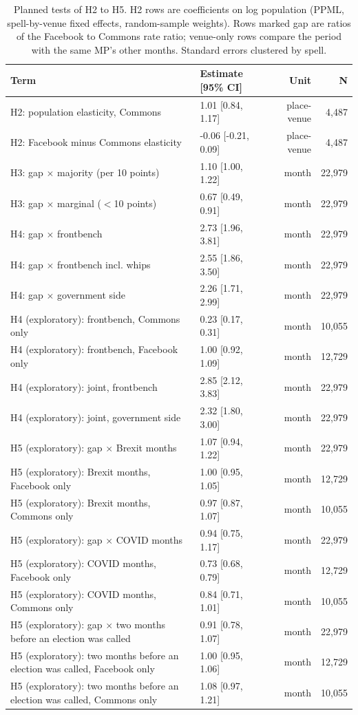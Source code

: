 \documentclass[11pt,a4paper]{article}
\begin{document}
\begin{table}[tbp]\centering\footnotesize\caption{Planned tests of H2 to H5. H2 rows are coefficients on log population (PPML, spell-by-venue fixed effects, random-sample weights). Rows marked gap are ratios of the Facebook to Commons rate ratio; venue-only rows compare the period with the same MP's other months. Standard errors clustered by spell.}\label{tab:het}\begin{tabular}{p{7.2cm}lrr}\toprule Term & Estimate [95\% CI] & Unit & N\\\midrule
H2: population elasticity, Commons & 1.01 [0.84, 1.17] & place-venue & 4,487\\
H2: Facebook minus Commons elasticity & -0.06 [-0.21, 0.09] & place-venue & 4,487\\
H3: gap $\times$ majority (per 10 points) & 1.10 [1.00, 1.22] & month & 22,979\\
H3: gap $\times$ marginal ($<$10 points) & 0.67 [0.49, 0.91] & month & 22,979\\
H4: gap $\times$ frontbench & 2.73 [1.96, 3.81] & month & 22,979\\
H4: gap $\times$ frontbench incl. whips & 2.55 [1.86, 3.50] & month & 22,979\\
H4: gap $\times$ government side & 2.26 [1.71, 2.99] & month & 22,979\\
H4 (exploratory): frontbench, Commons only & 0.23 [0.17, 0.31] & month & 10,055\\
H4 (exploratory): frontbench, Facebook only & 1.00 [0.92, 1.09] & month & 12,729\\
H4 (exploratory): joint, frontbench & 2.85 [2.12, 3.83] & month & 22,979\\
H4 (exploratory): joint, government side & 2.32 [1.80, 3.00] & month & 22,979\\
H5 (exploratory): gap $\times$ Brexit months & 1.07 [0.94, 1.22] & month & 22,979\\
H5 (exploratory): Brexit months, Facebook only & 1.00 [0.95, 1.05] & month & 12,729\\
H5 (exploratory): Brexit months, Commons only & 0.97 [0.87, 1.07] & month & 10,055\\
H5 (exploratory): gap $\times$ COVID months & 0.94 [0.75, 1.17] & month & 22,979\\
H5 (exploratory): COVID months, Facebook only & 0.73 [0.68, 0.79] & month & 12,729\\
H5 (exploratory): COVID months, Commons only & 0.84 [0.71, 1.01] & month & 10,055\\
H5 (exploratory): gap $\times$ two months before an election was called & 0.91 [0.78, 1.07] & month & 22,979\\
H5 (exploratory): two months before an election was called, Facebook only & 1.00 [0.95, 1.06] & month & 12,729\\
H5 (exploratory): two months before an election was called, Commons only & 1.08 [0.97, 1.21] & month & 10,055\\
\bottomrule\end{tabular}\end{table}
\end{document}
